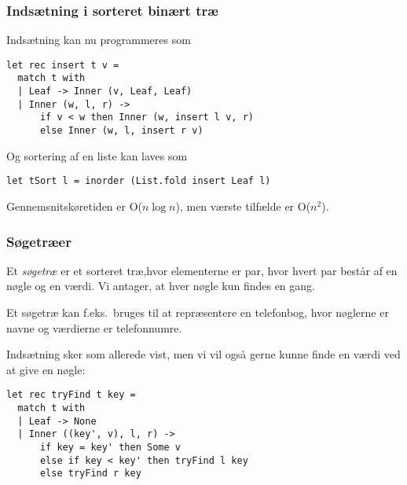 \documentclass{beamer}
\begin{document}
\begin{frame}[fragile=singleslide]
\frametitle{Indsætning i sorteret binært træ}

Indsætning kan nu programmeres som

\renewcommand{\baselinestretch}{0.9}
\begin{verbatim}
let rec insert t v =
  match t with
  | Leaf -> Inner (v, Leaf, Leaf)
  | Inner (w, l, r) ->
      if v < w then Inner (w, insert l v, r)
      else Inner (w, l, insert r v)
\end{verbatim}

\renewcommand{\baselinestretch}{1.0}

Og sortering af en liste kan laves som

\renewcommand{\baselinestretch}{0.9}
\begin{verbatim}
let tSort l = inorder (List.fold insert Leaf l)
\end{verbatim}

Gennemsnitskøretiden er O($n\log n$), men værste tilfælde er O($n^2$).

\end{frame}

\begin{frame}[fragile=singleslide]
\frametitle{Søgetræer}

Et \emph{søgetræ} er et sorteret træ,hvor elementerne er par, hvor
hvert par består af en nøgle og en værdi.  Vi antager, at hver nøgle
kun findes en gang.

Et søgetræ kan f.eks.\ bruges til at repræsentere en telefonbog, hvor
nøglerne er navne og værdierne er telefonnumre.

Indsætning sker som allerede vist, men vi vil også gerne kunne finde
en værdi ved at give en nøgle:

\renewcommand{\baselinestretch}{0.9}
\begin{verbatim}
let rec tryFind t key =
  match t with
  | Leaf -> None
  | Inner ((key', v), l, r) ->
      if key = key' then Some v
      else if key < key' then tryFind l key
      else tryFind r key
\end{verbatim}

\end{frame}
\end{document}
